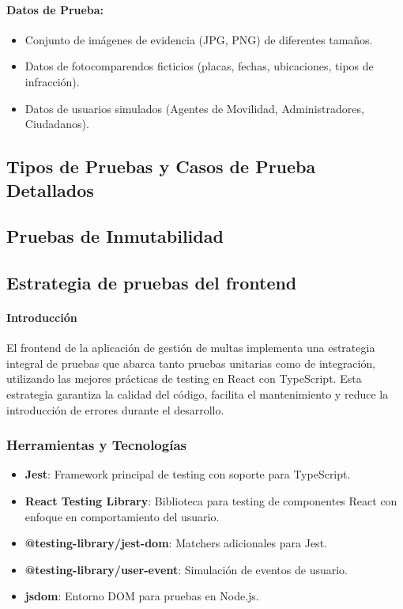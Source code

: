 \documentclass[
    letterpaper, 
    man,   
    spanish,
    12pt,
    donotrepeattitle,
    floatsintext,
    hidelinks %
]{apa7}
\begin{document}
\paragraph{Datos de Prueba:}
\begin{itemize}
    \item Conjunto de imágenes de evidencia (JPG, PNG) de diferentes tamaños. 
    \item Datos de fotocomparendos ficticios (placas, fechas, ubicaciones, tipos de infracción). 
    \item Datos de usuarios simulados (Agentes de Movilidad, Administradores, Ciudadanos).
\end{itemize}

\subsection{Tipos de Pruebas y Casos de Prueba Detallados}



\subsection{Pruebas de Inmutabilidad}



\subsection{Estrategia de pruebas del frontend}

\paragraph{Introducción}
El frontend de la aplicación de gestión de multas implementa una estrategia integral de pruebas que abarca tanto pruebas unitarias como de integración, utilizando las mejores prácticas de testing en React con TypeScript. Esta estrategia garantiza la calidad del código, facilita el mantenimiento y reduce la introducción de errores durante el desarrollo.

\subsubsection{Herramientas y Tecnologías}
\begin{itemize}
    \item \textbf{Jest}: Framework principal de testing con soporte para TypeScript.
    \item \textbf{React Testing Library}: Biblioteca para testing de componentes React con enfoque en comportamiento del usuario.
    \item \textbf{@testing-library/jest-dom}: Matchers adicionales para Jest.
    \item \textbf{@testing-library/user-event}: Simulación de eventos de usuario.
    \item \textbf{jsdom}: Entorno DOM para pruebas en Node.js.
\end{itemize}
\end{document}
